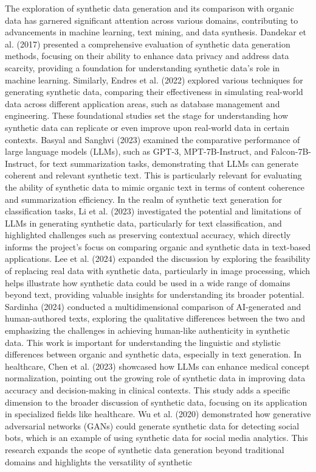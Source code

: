\documentclass[sigplan,screen]{acmart}
\begin{document}
The exploration of synthetic data generation and its comparison with organic data has garnered significant attention across various domains, contributing to advancements in machine learning, text mining, and data synthesis. Dandekar et al. (2017)\cite{dandekar2017comparative} presented a comprehensive evaluation of synthetic data generation methods, focusing on their ability to enhance data privacy and address data scarcity, providing a foundation for understanding synthetic data's role in machine learning. Similarly, Endres et al. (2022)\cite{10.1145/3548785.3548793} explored various techniques for generating synthetic data, comparing their effectiveness in simulating real-world data across different application areas, such as database management and engineering. These foundational studies set the stage for understanding how synthetic data can replicate or even improve upon real-world data in certain contexts. Basyal and Sanghvi (2023)\cite{basyal2023text} examined the comparative performance of large language models (LLMs), such as GPT-3, MPT-7B-Instruct, and Falcon-7B-Instruct, for text summarization tasks, demonstrating that LLMs\cite{lu2023machine} can generate coherent and relevant synthetic text. This is particularly relevant for evaluating the ability of synthetic data to mimic organic text in terms of content coherence and summarization efficiency. In the realm of synthetic text generation for classification tasks, Li et al. (2023)\cite{li2023synthetic} investigated the potential and limitations of LLMs in generating synthetic data, particularly for text classification, and highlighted challenges such as preserving contextual accuracy, which directly informs the project’s focus on comparing organic and synthetic data in text-based applications. Lee et al. (2024)\cite{lee2020biobert} expanded the discussion by exploring the feasibility of replacing real data with synthetic data, particularly in image processing\cite{lee2024exploring}, which helps illustrate how synthetic data could be used in a wide range of domains beyond text, providing valuable insights for understanding its broader potential. Sardinha (2024)\cite{sardinha2024ai} conducted a multidimensional comparison of AI-generated and human-authored texts, exploring the qualitative differences between the two and emphasizing the challenges in achieving human-like authenticity in synthetic data. This work is important for understanding the linguistic\cite{durango2023named} and stylistic differences between organic and synthetic data, especially in text generation. In healthcare, Chen et al. (2023)\cite{chen4979696enhancing} showcased how LLMs can enhance medical concept normalization, pointing out the growing role of synthetic data in improving data accuracy and decision-making in clinical contexts. This study adds a specific dimension to the broader discussion of synthetic data, focusing on its application in specialized fields like healthcare. Wu et al. (2020)\cite{9006873} demonstrated how generative adversarial networks (GANs) could generate synthetic data for detecting social bots\cite{adhikari2020nlp}, which is an example of using synthetic data for social media analytics. This research expands the scope of synthetic data generation beyond traditional domains and highlights the versatility of synthetic 
\end{document}
